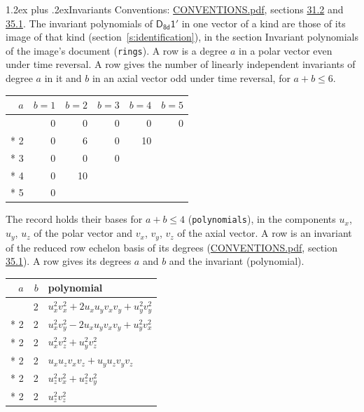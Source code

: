 \documentclass[10pt,a4paper]{article}
\makeatletter
\renewcommand\section{\@startsection{section}{1}{\z@}{-3ex plus -1ex minus -.2ex}%
  {1.2ex plus .2ex}{\normalfont\large\sffamily\bfseries\color{parttitle}}}
\numberwithin{equation}{section}
\newcommand{\grp}[1]{\mathsf{#1}}
\makeatother
\begin{document}
\section{Invariants}\label{s:invariants}
Conventions: \href{../../CONVENTIONS.pdf}{CONVENTIONS.pdf}, sections \href{../../CONVENTIONS.pdf\#conv.31.2}{31.2} and \href{../../CONVENTIONS.pdf\#conv.35.1}{35.1}.
The invariant polynomials of $\grp{D_{8d}1'}$ in one vector of a kind are those of its image of that kind (section~\ref{s:identification}), in the section Invariant polynomials of the image's document (\texttt{rings}).
\leavevmode\label{n:index.degree.polar}\label{n:index.degree.axial}A row is a degree $a$ in a polar vector even under time reversal. A row gives the number of linearly independent invariants of degree $a$ in it and $b$ in an axial vector odd under time reversal, for $a + b \le 6$.
{\small\begin{longtable}{@{}rrrrrr@{}}\toprule
$a$ & $b = 1$ & $b = 2$ & $b = 3$ & $b = 4$ & $b = 5$\\\midrule\endhead
\bottomrule\endfoot\endlastfoot
1 & 0 & 0 & 0 & 0 & 0\\*
2 & 0 & 6 & 0 & 10 & \\*
3 & 0 & 0 & 0 &  & \\*
4 & 0 & 10 &  &  & \\*
5 & 0 &  &  &  & \\
\bottomrule\end{longtable}}
\leavevmode\label{n:local.component.polar}\label{n:local.component.axial}The record holds their bases for $a + b \le 4$ (\texttt{polynomials}), in the components $u_{x}$, $u_{y}$, $u_{z}$ of the polar vector and $v_{x}$, $v_{y}$, $v_{z}$ of the axial vector. \label{n:head.polynomial}A row is an invariant of the reduced row echelon basis of its degrees (\href{../../CONVENTIONS.pdf}{CONVENTIONS.pdf}, section \href{../../CONVENTIONS.pdf\#conv.35.1}{35.1}). A row gives its degrees $a$ and $b$ and the invariant (polynomial).
{\small\renewcommand{\arraystretch}{1.2}\begin{longtable}{@{}rrl@{}}\toprule
$a$ & $b$ & polynomial\\\midrule\endhead
\bottomrule\endfoot\endlastfoot
2 & 2 & $u_{x}^{2}v_{x}^{2} + 2u_{x}u_{y}v_{x}v_{y} + u_{y}^{2}v_{y}^{2}$\\*
2 & 2 & $u_{x}^{2}v_{y}^{2} - 2u_{x}u_{y}v_{x}v_{y} + u_{y}^{2}v_{x}^{2}$\\*
2 & 2 & $u_{x}^{2}v_{z}^{2} + u_{y}^{2}v_{z}^{2}$\\*
2 & 2 & $u_{x}u_{z}v_{x}v_{z} + u_{y}u_{z}v_{y}v_{z}$\\*
2 & 2 & $u_{z}^{2}v_{x}^{2} + u_{z}^{2}v_{y}^{2}$\\*
2 & 2 & $u_{z}^{2}v_{z}^{2}$\\
\bottomrule\end{longtable}}
\end{document}
